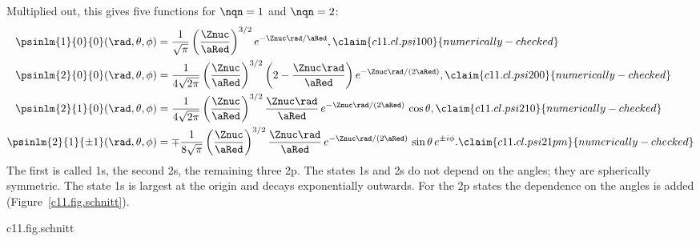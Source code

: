 
Multiplied out, this gives five functions for $\nqn = 1$ and $\nqn = 2$:
\begin{align}
  \psinlm{1}{0}{0}(\rad, \theta, \phi) &= \frac{1}{\sqrt{\pi}}
    \left(\frac{\Znuc}{\aRed}\right)^{3/2} e^{-\Znuc\rad/\aRed},
    \label{c11.eq.psi100}\claim{c11.cl.psi100}{numerically-checked} \\
  \psinlm{2}{0}{0}(\rad, \theta, \phi) &= \frac{1}{4\sqrt{2\pi}}
    \left(\frac{\Znuc}{\aRed}\right)^{3/2}
    \left(2 - \frac{\Znuc\rad}{\aRed}\right) e^{-\Znuc\rad/(2\aRed)},
    \label{c11.eq.psi200}\claim{c11.cl.psi200}{numerically-checked} \\
  \psinlm{2}{1}{0}(\rad, \theta, \phi) &= \frac{1}{4\sqrt{2\pi}}
    \left(\frac{\Znuc}{\aRed}\right)^{3/2}
    \frac{\Znuc\rad}{\aRed}\,e^{-\Znuc\rad/(2\aRed)}\,\cos\theta,
    \label{c11.eq.psi210}\claim{c11.cl.psi210}{numerically-checked} \\
  \psinlm{2}{1}{\pm 1}(\rad, \theta, \phi) &= \mp\frac{1}{8\sqrt{\pi}}
    \left(\frac{\Znuc}{\aRed}\right)^{3/2}
    \frac{\Znuc\rad}{\aRed}\,e^{-\Znuc\rad/(2\aRed)}\,\sin\theta\,e^{\pm i\phi}.
    \label{c11.eq.psi21pm}\claim{c11.cl.psi21pm}{numerically-checked}
\end{align}
The first is called 1s, the second 2s, the remaining three 2p. The states 1s and 2s do
not depend on the angles; they are spherically symmetric. The state 1s is largest
at the origin and decays exponentially outwards. For the 2p states the dependence on the
angles is added (Figure~\ref{c11.fig.schnitt}).

\begin{tpcfigure}{c11.fig.schnitt}
  \caption{The density $\abs{\psi}^2$ of the relative coordinate for the 2p states, as a
    section through the plane $y = 0$ and for $\Znuc = 1$; darker means larger, and both
    panels use the same linear grey scale. Left $\psinlm{2}{1}{0}$: two lobes along the
    $z$-axis, separated by the plane $z = 0$, in which the density vanishes. Right
    $\psinlm{2}{1}{\pm 1}$: in space this is a ring around the $z$-axis, on which the
    density vanishes; the section meets the ring twice. The axes are components of
    $\posRel = \posE - \posP$, not positions in the laboratory.}
\end{tpcfigure}

